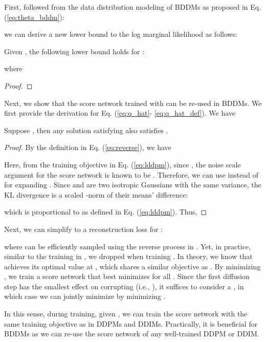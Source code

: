 First, followed from the data distribution modeling of BDDMs as proposed in Eq. (\ref{eq:theta_bddm}):

we can derive a new lower bound to the log marginal likelihood as follows:
\begin{proposition}
\label{prop:1}
Given , the following lower bound holds for :

where 

\end{proposition}
\begin{proof}

\end{proof}
Next, we show that the score network  trained with  can be re-used in BDDMs. We first provide the derivation for Eq. (\ref{eq:q_hat}- \ref{eq:q_hat_def}). We have

\begin{proposition}
\label{prop:theta}
Suppose , then any solution satisfying  also satisfies .
\end{proposition}
\begin{proof}
By the definition in Eq. (\ref{eq:reverse}), we have

Here, from the training objective in Eq. (\ref{eq:lddpm}), since , the noise scale argument for the score network is known to be . Therefore, we can use  instead of  for expanding . Since  and  are two isotropic Gaussians with the same variance, the KL divergence is a scaled -norm of their means' difference:

which is proportional to  as defined in Eq. (\ref{eq:lddpm}). Thus,


\end{proof}

Next, we can simplify  to a reconstruction loss for :

where  can be efficiently sampled using the reverse process in \citep{jiaming2021}. Yet, in practice, similar to the training in \citep{jiaming2021, nanxin2020, zhifeng2021}, we dropped  when  training . In theory, we know that  achieves its optimal value at , which shares a similar objective as . By minimizing , we train a score network  that best minimizes  for all . Since the first diffusion step has the smallest effect on corrupting  (i.e., ), it suffices to consider a , in which case we can jointly minimize  by minimizing .



In this sense, during training, given , we can train the score network with the same training objective as in DDPMs and DDIMs. Practically, it is beneficial for BDDMs as we can re-use the score network  of any well-trained DDPM or DDIM.



